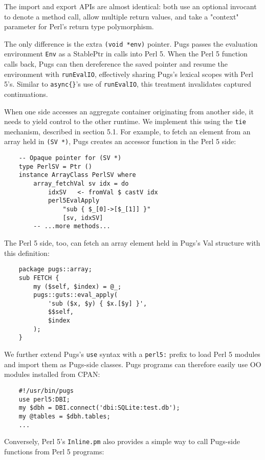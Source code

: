\documentclass[]{sigplanconf}
\newcommand{\code}[1]{\texttt{#1}}
\begin{document}
The import and export APIs are almost identical: both use an optional invocant
to denote a method call, allow multiple return values, and take a "context"
parameter for Perl's return type polymorphism.

The only difference is the extra \code{(void *env)} pointer.  Pugs passes the
evaluation environment \code{Env} as a StablePtr in calls into Perl 5.  When
the Perl 5 function calls back, Pugs can then dereference the saved pointer and
resume the environment with \code{runEvalIO}, effectively sharing Pugs's
lexical scopes with Perl 5's.  Similar to \code{async\{\}}'s use of
\code{runEvalIO}, this treatment invalidates captured continuations.

When one side accesses an aggregate container originating from another side, it
needs to yield control to the other runtime.  We implement this using the
\code{tie} mechanism, described in section 5.1.  For example, to fetch an
element from an array held in \code{(SV *)}, Pugs creates an accessor function
in the Perl 5 side:

\begin{lstlisting}
    -- Opaque pointer for (SV *)
    type PerlSV = Ptr ()
    instance ArrayClass PerlSV where
        array_fetchVal sv idx = do
            idxSV   <- fromVal $ castV idx
            perl5EvalApply
                "sub { $_[0]->[$_[1]] }"
                [sv, idxSV]
        -- ...more methods...
\end{lstlisting}

The Perl 5 side, too, can fetch an array element held in Pugs's Val structure
with this definition:

\begin{lstlisting}
    package pugs::array;
    sub FETCH {
        my ($self, $index) = @_;
        pugs::guts::eval_apply(
            'sub ($x, $y) { $x.[$y] }',
            $$self,
            $index
        );
    }
\end{lstlisting}

We further extend Pugs's \code{use} syntax with a \code{perl5:} prefix to load
Perl 5 modules and import them as Pugs-side classes.  Pugs programs can
therefore easily use OO modules installed from CPAN:

\begin{lstlisting}
    #!/usr/bin/pugs
    use perl5:DBI;
    my $dbh = DBI.connect('dbi:SQLite:test.db');
    my @tables = $dbh.tables;
    ...
\end{lstlisting}

Conversely, Perl 5's \texttt{Inline.pm} also provides a simple way to call
Pugs-side functions from Perl 5 programs:
\end{document}
